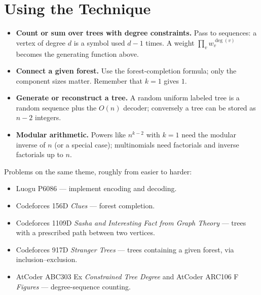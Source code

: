 \documentclass[11pt]{article}
\begin{document}
\section{Using the Technique}
\begin{itemize}[leftmargin=1.5em,itemsep=2pt]
  \item \textbf{Count or sum over trees with degree constraints.} Pass to
        sequences: a vertex of degree $d$ is a symbol used $d-1$ times. A
        weight $\prod_v w_v^{\deg(v)}$ becomes the generating function
        above.
  \item \textbf{Connect a given forest.} Use the forest-completion formula;
        only the component sizes matter. Remember that $k=1$ gives $1$.
  \item \textbf{Generate or reconstruct a tree.} A random uniform labeled
        tree is a random sequence plus the $O(n)$ decoder; conversely a
        tree can be stored as $n-2$ integers.
  \item \textbf{Modular arithmetic.} Powers like $n^{k-2}$ with $k=1$ need
        the modular inverse of $n$ (or a special case); multinomials need
        factorials and inverse factorials up to $n$.
\end{itemize}
Problems on the same theme, roughly from easier to harder:
\begin{itemize}[leftmargin=1.5em,itemsep=1pt]
  \item Luogu P6086 --- implement encoding and decoding.
  \item Codeforces 156D \emph{Clues} --- forest completion.
  \item Codeforces 1109D \emph{Sasha and Interesting Fact from Graph
        Theory} --- trees with a prescribed path between two vertices.
  \item Codeforces 917D \emph{Stranger Trees} --- trees containing a
        given forest, via inclusion--exclusion.
  \item AtCoder ABC303 Ex \emph{Constrained Tree Degree} and AtCoder
        ARC106 F \emph{Figures} --- degree-sequence counting.
\end{itemize}
\end{document}
